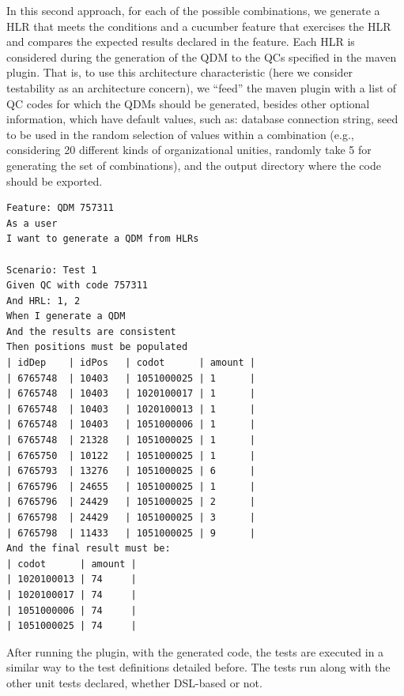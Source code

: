 \documentclass{bmcart}
\newcommand{\shc}{HLR\xspace}
\begin{document}
In this second approach, for each of the possible combinations, we generate a \shc that meets the conditions and a cucumber feature that exercises the \shc and compares the expected results declared in the feature. Each \shc is considered during the generation of the QDM to the QCs specified in the maven plugin.%
That is, to use this architecture characteristic (here we consider testability as an architecture concern), we ``feed'' the maven plugin with a list of QC codes for which the QDMs should be generated, besides other optional information, which have default values, such as: database connection string, seed to be used in the random selection of values within a combination (e.g., considering 20 different kinds of organizational unities, randomly take 5 for generating the set of combinations), and the output directory 
where the code should be exported. 


\begin{lstlisting}[frame=single, language=Cucumber, caption={\it Cucumber feature}, label={code:cucumber}]
Feature: QDM 757311
As a user
I want to generate a QDM from HLRs

Scenario: Test 1
Given QC with code 757311
And HRL: 1, 2
When I generate a QDM
And the results are consistent
Then positions must be populated
| idDep    | idPos   | codot      | amount |
| 6765748  | 10403   | 1051000025 | 1      |
| 6765748  | 10403   | 1020100017 | 1      |
| 6765748  | 10403   | 1020100013 | 1      |
| 6765748  | 10403   | 1051000006 | 1      |
| 6765748  | 21328   | 1051000025 | 1      |
| 6765750  | 10122   | 1051000025 | 1      |    
| 6765793  | 13276   | 1051000025 | 6      |
| 6765796  | 24655   | 1051000025 | 1      |
| 6765796  | 24429   | 1051000025 | 2      |
| 6765798  | 24429   | 1051000025 | 3      |
| 6765798  | 11433   | 1051000025 | 9      |   
And the final result must be:
| codot      | amount |
| 1020100013 | 74     |
| 1020100017 | 74     |
| 1051000006 | 74     |
| 1051000025 | 74     |

\end{lstlisting}

After running the plugin, with the generated code, the tests are executed in a similar way to the test definitions detailed before. The tests run along with the other unit tests declared, whether DSL-based or not.
\end{document}

